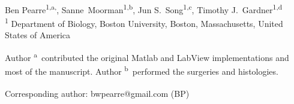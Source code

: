 \documentclass[10pt,letterpaper]{article}
\date{}
\begin{document}
\vspace*{0.35in}

\begin{flushleft}
{\Large
  \textbf{}
}
\newline
\\
Ben Pearre\textsuperscript{1,a,\textcurrency},
Sanne~Moorman\textsuperscript{1,b},
Jun S.~Song\textsuperscript{1,c},
Timothy J.~Gardner\textsuperscript{1,d}
\\
\bigskip
\textsuperscript{1} Department of Biology, Boston University, Boston, Massachusetts, United States of America
\\
\bigskip

% 
%
Author \textsuperscript{a}~contributed the original Matlab and LabView implementations and most of the manuscript. Author \textsuperscript{b}~performed the surgeries and histologies.





\textsuperscript{\textcurrency} Corresponding author: bwpearre@gmail.com (BP)

\end{flushleft}
\end{document}
